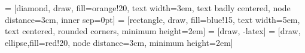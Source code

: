 \usetikzlibrary{positioning, fit, calc}
\usetikzlibrary{shapes,snakes}
\usetikzlibrary{patterns}

 = [diamond, draw, fill=orange!20, 
text width=3em, text badly centered, node distance=3cm, inner sep=0pt]
 = [rectangle, draw, fill=blue!15, 
text width=5em, text centered, rounded corners, minimum height=2em]
 = [draw, -latex]
 = [draw, ellipse,fill=red!20, node distance=3cm,
minimum height=2em]


